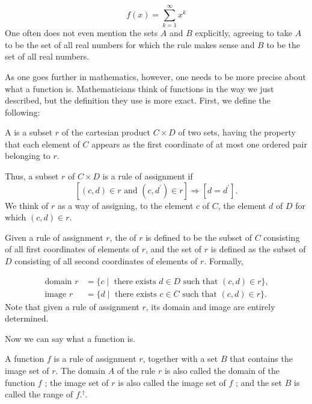\[
f(x) = \mathop{\sum }\limits_{{k = 1}}^{\infty }x^{k}
\]
One often does not even mention the sets \(A\) and \(B\) explicitly, 
agreeing to take \(A\) to be the set of all real numbers for which 
the rule makes sense and \(B\) to be the set of all real numbers.

As one goes further in mathematics, however, one needs to be more precise 
about what a function is. Mathematicians think of functions in the way we just described, 
but the definition they use is more exact. First, we define the following:

\begin{definition} 
 A  is a subset \(r\) of the cartesian product \(C \times D\) of two sets, having the property that each element of \(C\) appears as the first coordinate of at most one ordered pair belonging to \(r\).

 Thus, a subset \(r\) of \(C \times D\) is a rule of assignment if
 \[
 [{({c,d}) \in r\text{ and }({c,d^{\prime }}) \in r}] \Rightarrow [{d = d^{\prime }}] .
 \]
 We think of \(r\) as a way of assigning, to the element \(c\) of \(C\), the element \(d\) of \(D\) for which \(({c,d}) \in r\).

 Given a rule of assignment \(r\), the  of \(r\) is defined to be the subset of \(C\) consisting of all first coordinates of elements of \(r\), and the  set of \(r\) is defined as the subset of \(D\) consisting of all second coordinates of elements of \(r\). Formally,

 \[
 \begin{aligned}
 \text{ domain }r &= \{ c \mid \text{ there exists }d \in D\text{ such that }({c,d}) \in r\} \text{, } \\
 \text{ image }r &= \{ d \mid \text{ there exists }c \in C\text{ such that }({c,d}) \in r\} \text{.}
 \end{aligned}
 \]
 Note that given a rule of assignment \(r\), its domain and image are entirely determined.
\end{definition}

Now we can say what a function is.

\begin{definition}
 A function \(f\) is a rule of assignment \(r\), together with a set \(B\) that contains the image set of \(r\). The domain \(A\) of the rule \(r\) is also called the domain of the function \(f\) ; the image set of \(r\) is also called the image set of \(f\) ; and the set \(B\) is called the range of \(f{.}^{\dagger}\).
\end{definition}

